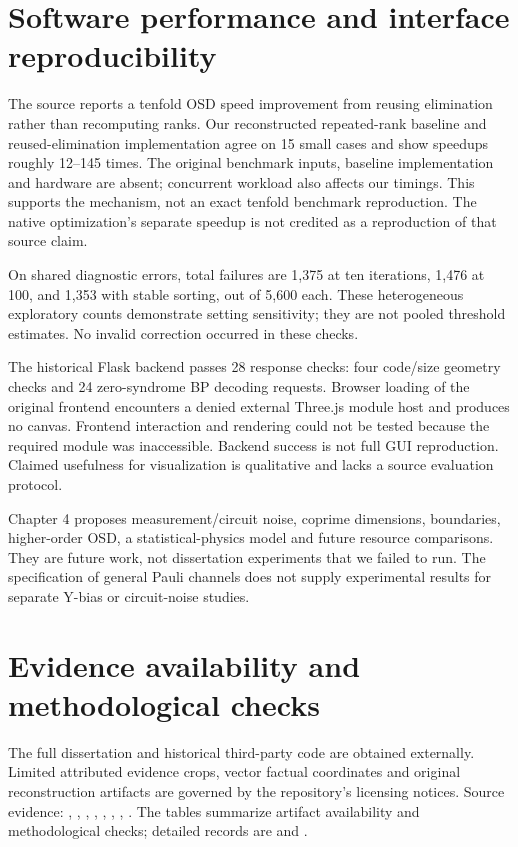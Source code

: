 \section{Software performance and interface reproducibility}
The source reports a tenfold OSD speed improvement from reusing elimination rather than recomputing ranks. Our reconstructed repeated-rank baseline and reused-elimination implementation agree on 15 small cases and show speedups roughly 12--145 times. The original benchmark inputs, baseline implementation and hardware are absent; concurrent workload also affects our timings. This supports the mechanism, not an exact tenfold benchmark reproduction. The native optimization's separate speedup is not credited as a reproduction of that source claim.

On shared diagnostic errors, total failures are 1,375 at ten iterations, 1,476 at 100, and 1,353 with stable sorting, out of 5,600 each. These heterogeneous exploratory counts demonstrate setting sensitivity; they are not pooled threshold estimates. No invalid correction occurred in these checks.

The historical Flask backend passes 28 response checks: four code/size geometry checks and 24 zero-syndrome BP decoding requests. Browser loading of the original frontend encounters a denied external Three.js module host and produces no canvas. Frontend interaction and rendering could not be tested because the required module was inaccessible. Backend success is not full GUI reproduction. Claimed usefulness for visualization is qualitative and lacks a source evaluation protocol.

Chapter 4 proposes measurement/circuit noise, coprime dimensions, boundaries, higher-order OSD, a statistical-physics model and future resource comparisons. They are future work, not dissertation experiments that we failed to run. The specification of general Pauli channels does not supply experimental results for separate Y-bias or circuit-noise studies.

\section{Evidence availability and methodological checks}
The full dissertation and historical third-party code are obtained externally. Limited attributed evidence crops, vector factual coordinates and original reconstruction artifacts are governed by the repository's licensing notices. Source evidence: , , , , , , , . The tables summarize artifact availability and methodological checks; detailed records are  and . 



